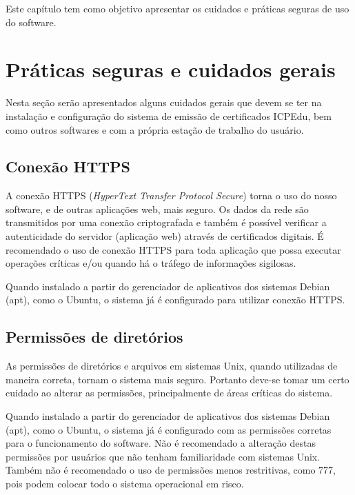                   

Este capítulo tem como objetivo apresentar os cuidados e práticas seguras de uso do software.

\section{Práticas seguras e cuidados gerais}

Nesta seção serão apresentados alguns cuidados gerais que devem se ter na instalação e configuração do sistema de emissão de certificados ICPEdu, bem como outros softwares e com a própria estação de trabalho do usuário.

\subsection{Conexão HTTPS}

A conexão HTTPS (\textit{HyperText Transfer Protocol Secure}) torna o uso do nosso software, e de outras aplicações web, mais seguro. Os dados da rede são transmitidos por uma conexão criptografada e também é possível verificar a autenticidade do servidor (aplicação web) através de certificados digitais.
É recomendado o uso de conexão HTTPS para toda aplicação que possa executar operações críticas e/ou quando há o tráfego de informações sigilosas.

Quando instalado a partir do gerenciador de aplicativos dos sistemas Debian (apt), como o Ubuntu, o sistema já é configurado para utilizar conexão HTTPS.

\subsection{Permissões de diretórios}

As permissões de diretórios e arquivos em sistemas Unix, quando utilizadas de maneira correta, tornam o sistema mais seguro. Portanto deve-se tomar um certo cuidado ao alterar as permissões, principalmente de áreas críticas do sistema.

Quando instalado a partir do gerenciador de aplicativos dos sistemas Debian (apt), como o Ubuntu, o sistema já é configurado com as permissões corretas para o funcionamento do software.
Não é recomendado a alteração destas permissões por usuários que não tenham familiaridade com sistemas Unix.
Também não é recomendado o uso de permissões menos restritivas, como 777, pois podem colocar todo o sistema operacional em risco.

